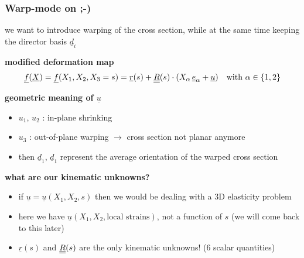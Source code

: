 \begin{frame}
  \frametitle{Warp-mode on ;-)}
  
  we want to introduce warping of the cross section, \newline
  while at the same time keeping the director basis $\underline{d}_i$
  \vspace{0.6em}
  
  \textbf{modified deformation map}
  \begin{displaymath}
    \underline{f}(\underline{X}) = \underline{f}(X_1,X_2,X_3=s) = \underline{r}(s) + \underline{\underline{R}}(s) \cdot (X_{\alpha} \, \underline{e}_{\alpha} + \underline{u}) \quad \text{with } \alpha \in \{1,2\}
  \end{displaymath}
  
  \vspace{0.3em}
  \textbf{geometric meaning of $\underline{u}$}
  \begin{itemize}
    \item $u_1$, $u_2$ : in-plane shrinking %
    \item $u_3$ : out-of-plane warping $\rightarrow$ cross section not planar anymore
    \item then $\underline{d}_1$, $\underline{d}_1$ represent the average orientation of the warped cross section
  \end{itemize}
  \vspace{0.6em}
  
  \textbf{what are our kinematic unknowns?}
  \begin{itemize}
    \item if $\underline{u} = \underline{u}(X_1,X_2,s)$ then we would be dealing with a 3D elasticity problem
    \item here we have $\underline{u}(X_1,X_2,\text{local strains})$, not a function of $s$ \newline (we will come back to this later)
    \item $\underline{r}(s)$ and $\underline{\underline{R}}(s)$ are the only kinematic unknowns! (6 scalar quantities)
  \end{itemize}
\end{frame}


